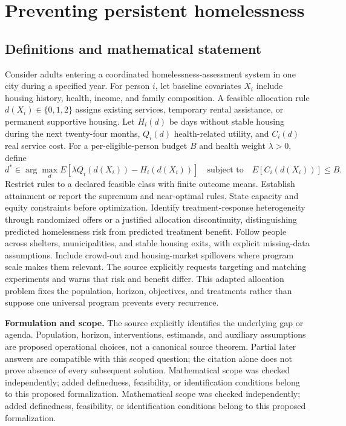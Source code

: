 \documentclass[11pt]{article}
\begin{document}
\section*{Preventing persistent homelessness}\label{30007751}
\subsection{Definitions and mathematical statement}
Consider adults entering a coordinated homelessness-assessment system in one city during a specified year. For person \(i\), let baseline covariates \(X_i\) include housing history, health, income, and family composition. A feasible allocation rule \(d(X_i)\in\{0,1,2\}\) assigns existing services, temporary rental assistance, or permanent supportive housing. Let \(H_i(d)\) be days without stable housing during the next twenty-four months, \(Q_i(d)\) health-related utility, and \(C_i(d)\) real service cost. For a per-eligible-person budget \(B\) and health weight \(\lambda>0\), define
\[d^*\in\arg\max_d E[\lambda Q_i(d(X_i))-H_i(d(X_i))]\quad\text{subject to}\quad E[C_i(d(X_i))]\leq B.\]
Restrict rules to a declared feasible class with finite outcome means. Establish attainment or report the supremum and near-optimal rules. State capacity and equity constraints before optimization. Identify treatment-response heterogeneity through randomized offers or a justified allocation discontinuity, distinguishing predicted homelessness risk from predicted treatment benefit. Follow people across shelters, municipalities, and stable housing exits, with explicit missing-data assumptions. Include crowd-out and housing-market spillovers where program scale makes them relevant. The source explicitly requests targeting and matching experiments and warns that risk and benefit differ. This adapted allocation problem fixes the population, horizon, objectives, and treatments rather than suppose one universal program prevents every recurrence.

\par\textbf{Formulation and scope.} The source explicitly identifies the underlying gap or agenda. Population, horizon, interventions, estimands, and auxiliary assumptions are proposed operational choices, not a canonical source theorem. Partial later answers are compatible with this scoped question; the citation alone does not prove absence of every subsequent solution. Mathematical scope was checked independently; added definedness, feasibility, or identification conditions belong to this proposed formalization. Mathematical scope was checked independently; added definedness, feasibility, or identification conditions belong to this proposed formalization.
\end{document}
